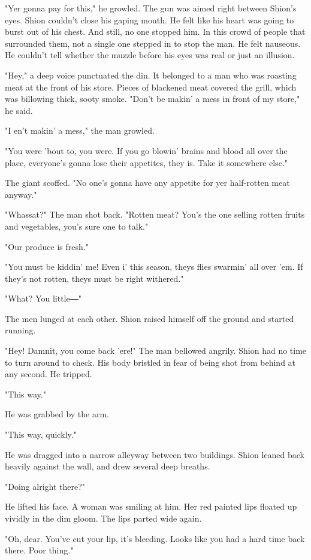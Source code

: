 "Yer gonna pay for this," he growled. The gun was aimed right between
Shion's eyes. Shion couldn't close his gaping mouth. He felt like his
heart was going to burst out of his chest. And still, no one stopped
him. In this crowd of people that surrounded them, not a single one
stepped in to stop the man. He felt nauseous. He couldn't tell whether
the muzzle before his eyes was real or just an illusion.

"Hey," a deep voice punctuated the din. It belonged to a man who was
roasting meat at the front of his store. Pieces of blackened meat
covered the grill, which was billowing thick, sooty smoke. "Don't be
makin' a mess in front of my store," he said.

"I en't makin' a mess," the man growled.

"You were 'bout to, you were. If you go blowin' brains and blood all
over the place, everyone's gonna lose their appetites, they is. Take it
somewhere else."

The giant scoffed. "No one's gonna have any appetite for yer half-rotten
meat anyway."

"Whassat?" The man shot back. "Rotten meat? You's the one selling rotten
fruits and vegetables, you's sure one to talk."

"Our produce is fresh."

"You must be kiddin' me! Even i' this season, theys flies swarmin' all
over 'em. If they's not rotten, theys must be right withered."

"What? You little―"

The men lunged at each other. Shion raised himself off the ground and
started running.

"Hey! Damnit, you come back 'ere!" The man bellowed angrily. Shion had
no time to turn around to check. His body bristled in fear of being shot
from behind at any second. He tripped.

"This way."

He was grabbed by the arm.

"This way, quickly."

He was dragged into a narrow alleyway between two buildings. Shion
leaned back heavily against the wall, and drew several deep breaths.

"Doing alright there?"

He lifted his face. A woman was smiling at him. Her red painted lips
floated up vividly in the dim gloom. The lips parted wide again.

"Oh, dear. You've cut your lip, it's bleeding. Looks like you had a hard
time back there. Poor thing."


